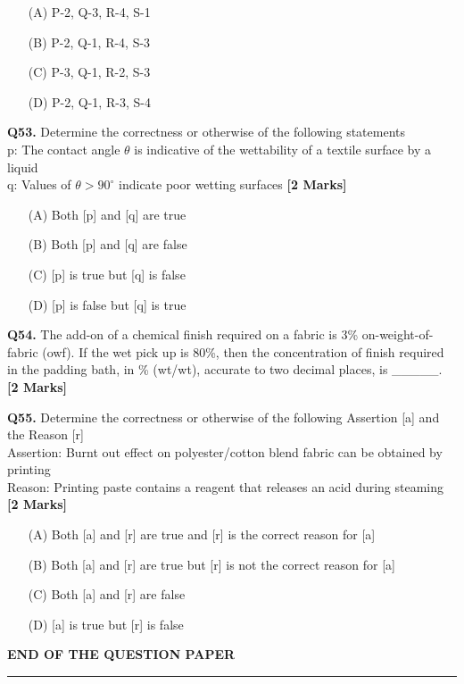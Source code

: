 \documentclass[11pt]{article}
\newcommand{\questionb}[2]{
    \noindent\textbf{Q#2.} #1 \hfill \textbf{[2 Marks]}
}
\begin{document}
\begin{enumerate}
    \item[(A)] P-2, Q-3, R-4, S-1  
    \item[(B)] P-2, Q-1, R-4, S-3  
    \item[(C)] P-3, Q-1, R-2, S-3  
    \item[(D)] P-2, Q-1, R-3, S-4  
\end{enumerate}
\vspace{0.5cm}

\questionb{Determine the correctness or otherwise of the following statements\\

p: The contact angle \(\theta\) is indicative of the wettability of a textile surface by a liquid  \\
q: Values of \(\theta > 90^\circ\) indicate poor wetting surfaces  }{53}

\begin{enumerate}
    \item[(A)] Both [p] and [q] are true  
    \item[(B)] Both [p] and [q] are false  
    \item[(C)] [p] is true but [q] is false  
    \item[(D)] [p] is false but [q] is true  
\end{enumerate}
\vspace{0.5cm}

\questionb{The add-on of a chemical finish required on a fabric is 3\% on-weight-of-fabric (owf). If the wet pick up is 80\%, then the concentration of finish required in the padding bath, in \% (wt/wt), accurate to two decimal places, is \_\_\_\_\_.}{54}
\vspace{0.5cm}

\questionb{Determine the correctness or otherwise of the following Assertion [a] and the Reason [r]\\

Assertion: Burnt out effect on polyester/cotton blend fabric can be obtained by printing  \\
Reason: Printing paste contains a reagent that releases an acid during steaming  }{55}

\begin{enumerate}
    \item[(A)] Both [a] and [r] are true and [r] is the correct reason for [a]  
    \item[(B)] Both [a] and [r] are true but [r] is not the correct reason for [a]  
    \item[(C)] Both [a] and [r] are false  
    \item[(D)] [a] is true but [r] is false  
\end{enumerate}
\vspace{0.5cm}

\begin{center}
\textbf{END OF THE QUESTION PAPER}
\rule{\textwidth}{0.5pt} 
\end{center}
\end{document}
